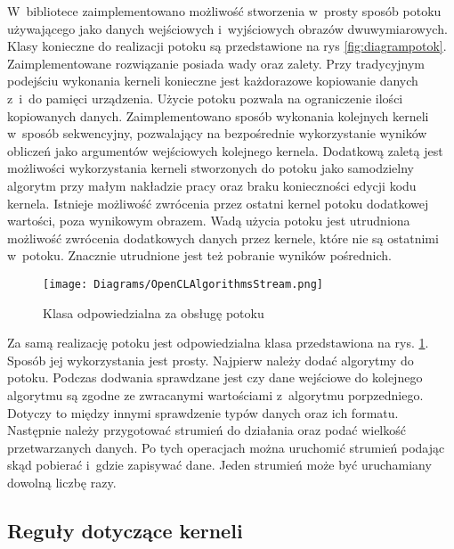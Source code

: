 W~bibliotece zaimplementowano możliwość stworzenia w~prosty sposób potoku używającego jako danych wejściowych i~wyjściowych obrazów dwuwymiarowych. Klasy konieczne do realizacji potoku są przedstawione na rys \ref{fig:diagrampotok}. Zaimplementowane rozwiązanie posiada wady oraz zalety. Przy tradycyjnym podejściu wykonania kerneli konieczne jest każdorazowe kopiowanie danych z~i~do pamięci urządzenia. Użycie potoku pozwala na ograniczenie ilości kopiowanych danych. Zaimplementowano sposób wykonania kolejnych kerneli w~sposób sekwencyjny, pozwalający na bezpośrednie wykorzystanie wyników obliczeń jako argumentów wejściowych kolejnego kernela. Dodatkową zaletą jest możliwości wykorzystania kerneli stworzonych do potoku jako samodzielny algorytm przy małym nakładzie pracy oraz braku konieczności edycji kodu kernela. Istnieje możliwość zwrócenia przez ostatni kernel potoku dodatkowej wartości, poza wynikowym obrazem. Wadą użycia potoku jest utrudniona możliwość zwrócenia dodatkowych danych przez kernele, które nie są ostatnimi w~potoku. Znacznie utrudnione jest też pobranie wyników pośrednich.

\begin{figure}
\begin{center}
\texttt{[image: Diagrams/OpenCLAlgorithmsStream.png]}
\end{center}
\caption{Klasa odpowiedzialna za obsługę potoku}
\label{fig:openCLAlgorithmsStream}
\end{figure}

Za samą realizację potoku jest odpowiedzialna klasa przedstawiona na rys. \ref{fig:openCLAlgorithmsStream}. Sposób jej wykorzystania jest prosty. Najpierw należy dodać algorytmy do potoku. Podczas dodwania sprawdzane jest czy dane wejściowe do kolejnego algorytmu są zgodne ze zwracanymi wartościami z~algorytmu porpzedniego. Dotyczy to między innymi sprawdzenie typów danych oraz ich formatu. Następnie należy przygotować strumień do działania oraz podać wielkość przetwarzanych danych. Po tych operacjach można uruchomić strumień podając skąd pobierać i~gdzie zapisywać dane. Jeden strumień może być uruchamiany dowolną liczbę razy.

\subsection{Reguły dotyczące kerneli}
\label{subsec:regulykerneli}

